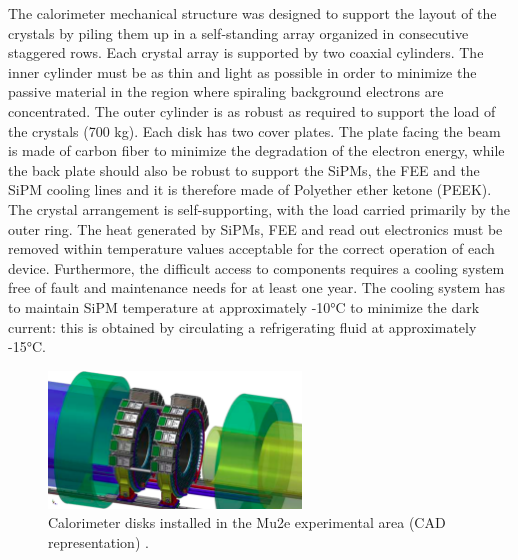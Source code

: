 The calorimeter mechanical structure was designed to support the layout of the crystals 
by piling them up in a self-standing array organized in consecutive staggered rows. 
Each crystal array is supported by two coaxial cylinders. The inner cylinder must be 
as thin and light as possible in order to minimize the passive material in the 
region where spiraling background electrons are concentrated. The outer cylinder 
is as robust as required to support the load of the crystals (700 kg). Each disk 
has two cover plates. The plate facing the beam is made of carbon fiber to minimize 
the degradation of the electron energy, while the back plate should also be robust 
to support the SiPMs, the FEE and the SiPM cooling lines and it 
is therefore made of Polyether ether ketone (PEEK). The crystal arrangement is 
self-supporting, with the load carried primarily by the outer ring. 
The heat generated by SiPMs, FEE and read out electronics 
must be removed within temperature values acceptable for the correct operation 
of each device. Furthermore, the difficult access to components requires a 
cooling system free of fault and maintenance needs for at least one year. 
The cooling system has to maintain SiPM temperature at approximately -10°C to 
minimize the dark current: this is obtained by circulating a refrigerating fluid at approximately  -15°C.


\begin{figure}[!h]
    \centering
    \includegraphics[width =0.6\textwidth]{figures/png/Screenshot_20240322_122050.png}
    \caption[CAD representation of the calorimeter disks.]{Calorimeter disks installed in the Mu2e experimental area (CAD representation) \cite{em7}.}
    \label{fig:calo1}
\end{figure}



